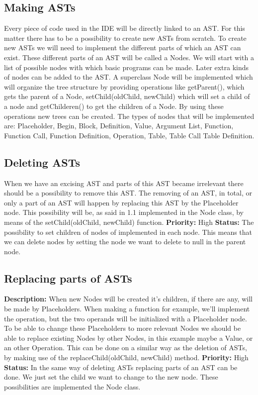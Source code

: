 \documentclass[a4paper,12pt]{report}
\begin{document}
\subsection{Making ASTs}
 Every piece of code used in the IDE will be directly linked to an AST. For this matter there has to be a possibility to create new ASTs from scratch.
To create new ASTs we will need to implement the different parts of which an AST can exist. These different parts of an AST will be called a Nodes. We will start with
a list of possible nodes with which basic programs can be made. Later extra kinds of nodes can be added to the AST.
A superclass Node will be implemented which will organize the tree structure by providing operations like getParent(), which gets the parent of a Node, setChild(oldChild, newChild)
which will set a child of a node and getChilderen() to get the children of a Node. By using these operations new trees can be created. 
The types of nodes that will be implemented are: Placeholder, Begin, Block, Definition, Value, Argument List, Function, Function Call, Function Definition, Operation, Table, Table Call
Table Definition.
 \newline

\subsection{Deleting ASTs}
When we have an excising AST and parts of this AST became irrelevant there should be a possibility to remove this AST. The removing of an AST, in total,
or only a part of an AST will happen by replacing this AST by the Placeholder node. This possibility will be, as said in 1.1 implemented in the Node class, by means of the 
setChild(oldChild, newChild) function. \newline
\textbf{Priority:} High \newline
\textbf{Status: } The possibility to set children of nodes of implemented in each node. This means that we can delete nodes by setting the 
node we want to delete to null in the parent node.\newline
\subsection{Replacing parts of ASTs}
\textbf{Description: }When new Nodes will be created it's children, if there are any, will be made by Placeholders. When making a function for example, we'll implement the operation,
but the two operands will be initialized with a Placeholder node. To be able to change these Placeholders to more relevant Nodes we should be able to 
replace existing Nodes by other Nodes, in this example maybe a Value, or an other Operation. This can be done on a similar way as the deletion of ASTs, by making use of the replaceChild(oldChild, newChild) method.\newline
\textbf{Priority:} High \newline
\textbf{Status: } In the same way of deleting ASTs replacing parts of an AST can be done. We just set the child we want to change to the 
new node. These possibilities are implemented the Node class.\newline
\end{document}
